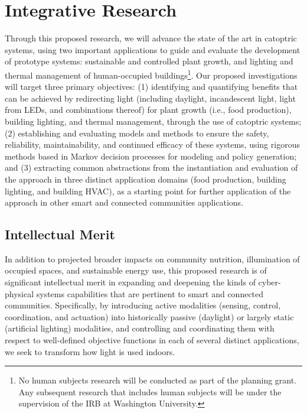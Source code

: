 \section{Integrative Research}
\label{sec:research}


Through this proposed research, we will advance the state of the art in
catoptric systems, using two important applications to guide and evaluate the
development of prototype systems: sustainable and controlled plant growth,
and lighting
and thermal management of human-occupied buildings\footnote{No human subjects
research will be conducted as part of the planning grant. Any subsequent
research
that includes human subjects will be under the supervision of the IRB at
Washington University.}.
Our proposed investigations
will target three primary objectives: (1) identifying and quantifying benefits
that can be achieved by redirecting light (including daylight, incandescent
light, light from LEDs, and combinations thereof) for 
plant growth (i.e., food production),
building lighting, and thermal management, through the use of
catoptric systems; (2) establishing and evaluating models and methods to ensure
the safety, reliability, maintainability, and continued efficacy of these
systems, using rigorous methods based in Markov decision processes for modeling
and policy generation; and (3) extracting common abstractions from the
instantiation and evaluation of the approach in three distinct application
domains (food production, building lighting, and building HVAC), as a starting
point for further application of the approach in other smart and connected
communities applications.

\subsection{Intellectual Merit}
\label{sec:im}

In addition to projected broader impacts on community nutrition, illumination
of occupied spaces, and sustainable energy use, this proposed research is of
significant intellectual merit in expanding and deepening the kinds of
cyber-physical systems capabilities that are pertinent to smart and connected
communities. Specifically, by introducing active modalities (sensing, control,
coordination, and actuation) into historically passive (daylight) or largely
static (artificial lighting) modalities, and controlling and coordinating them
with respect to well-defined objective functions in each of several distinct
applications, we seek to transform how light is used indoors.  

